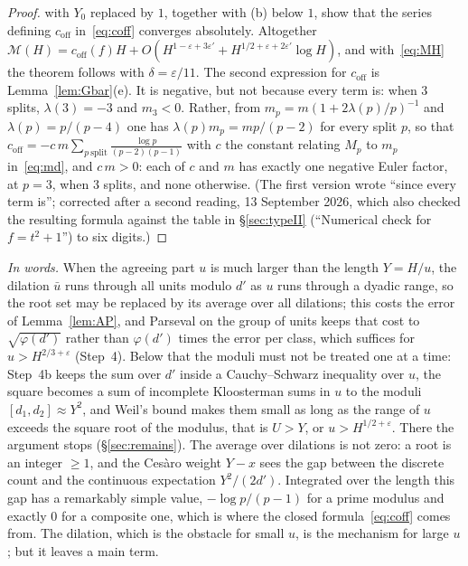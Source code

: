 \documentclass[11pt,a4paper]{article}
\theoremstyle{remark}\newtheorem{remark}[theorem]{Remark}
\begin{document}
\begin{proof}
with $Y_0$ replaced by $1$, together with (b) below $1$, show that the series defining $c_{\mathrm{off}}$ in~\eqref{eq:coff}
converges absolutely. Altogether $\mathcal M(H)=c_{\mathrm{off}}(f)H+O(H^{1-\varepsilon+3\varepsilon'}+H^{1/2+\varepsilon+2\varepsilon'}\log H)$, and
with~\eqref{eq:MH} the theorem follows with $\delta=\varepsilon/11$. The second expression for $c_{\mathrm{off}}$ is
Lemma~\ref{lem:Gbar}(e). It is negative, but not because every term is: when $3$ splits, $\lambda(3)=-3$ and
$m_3<0$. Rather, from $m_p=m(1+2\lambda(p)/p)^{-1}$ and $\lambda(p)=p/(p-4)$ one has $\lambda(p)m_p=mp/(p-2)$ for every
split $p$, so that $c_{\mathrm{off}}=-c\,m\sum_{p\ \mathrm{split}}\frac{\log p}{(p-2)(p-1)}$ with $c$ the constant relating
$M_p$ to $m_p$ in~\eqref{eq:md}, and $c\,m>0$: each of $c$ and $m$ has exactly one negative Euler factor, at $p=3$, when
$3$ splits, and none otherwise. (The first version wrote ``since every term is''; corrected after a second reading,
13 September 2026, which also checked the resulting formula against the table in \S\ref{sec:typeII} (``Numerical check for $f=t^2+1$'') to six
digits.)
\end{proof}

\emph{In words.} When the agreeing part $u$ is much larger than the length $Y=H/u$, the dilation $\bar u$ runs
through all units modulo $d'$ as $u$ runs through a dyadic range, so the root set may be replaced by its average
over all dilations; this costs the error of Lemma~\ref{lem:AP}, and Parseval on the group of units keeps that cost
to $\sqrt{\varphi(d')}$ rather than $\varphi(d')$ times the error per class, which suffices for $u>H^{2/3+\varepsilon}$
(Step~4). Below that the moduli must not be treated one at a time: Step~4b keeps the sum over $d'$ inside a
Cauchy--Schwarz inequality over $u$, the square becomes a sum of incomplete Kloosterman sums in $u$ to the moduli
$[d_1,d_2]\approx Y^2$, and Weil's bound makes them small as long as the range of $u$ exceeds the square root of the
modulus, that is $U>Y$, or $u>H^{1/2+\varepsilon}$. There the argument stops (\S\ref{sec:remains}). The average over dilations is not zero: a root is an integer $\ge1$, and the Ces\`aro weight
$Y-x$ sees the gap between the discrete count and the continuous expectation $Y^2/(2d')$. Integrated over the
length this gap has a remarkably simple value, $-\log p/(p-1)$ for a prime modulus and exactly $0$ for a composite
one, which is where the closed formula~\eqref{eq:coff} comes from. The dilation, which is the obstacle for
small $u$, is the mechanism for large $u$; but it leaves a main term.
\end{document}
